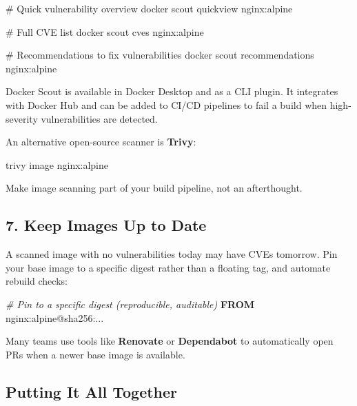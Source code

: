 \documentclass[11pt,american,a4paper,]{book}
\newenvironment{Shaded}{}{}
\newcommand{\CommentTok}[1]{\textcolor[rgb]{0.38,0.63,0.69}{\textit{#1}}}
\newcommand{\KeywordTok}[1]{\textcolor[rgb]{0.00,0.44,0.13}{\textbf{#1}}}
\newcommand{\NormalTok}[1]{#1}
\begin{document}
\begin{Shaded}
\begin{Highlighting}[]
\NormalTok{\# Quick vulnerability overview}
\NormalTok{docker scout quickview nginx:alpine}

\NormalTok{\# Full CVE list}
\NormalTok{docker scout cves nginx:alpine}

\NormalTok{\# Recommendations to fix vulnerabilities}
\NormalTok{docker scout recommendations nginx:alpine}
\end{Highlighting}
\end{Shaded}

Docker Scout is available in Docker Desktop and as a CLI plugin. It
integrates with Docker Hub and can be added to CI/CD pipelines to fail a
build when high-severity vulnerabilities are detected.

An alternative open-source scanner is \textbf{Trivy}:

\begin{Shaded}
\begin{Highlighting}[]
\NormalTok{trivy image nginx:alpine}
\end{Highlighting}
\end{Shaded}

Make image scanning part of your build pipeline, not an afterthought.

\subsection{7. Keep Images Up to Date}\label{keep-images-up-to-date}

A scanned image with no vulnerabilities today may have CVEs tomorrow.
Pin your base image to a specific digest rather than a floating tag, and
automate rebuild checks:

\begin{Shaded}
\begin{Highlighting}[]
\CommentTok{\# Pin to a specific digest (reproducible, auditable)}
\KeywordTok{FROM}\NormalTok{ nginx:alpine@sha256:...}
\end{Highlighting}
\end{Shaded}

Many teams use tools like \textbf{Renovate} or \textbf{Dependabot} to
automatically open PRs when a newer base image is available.

\subsection{Putting It All Together}\label{putting-it-all-together}
\end{document}
